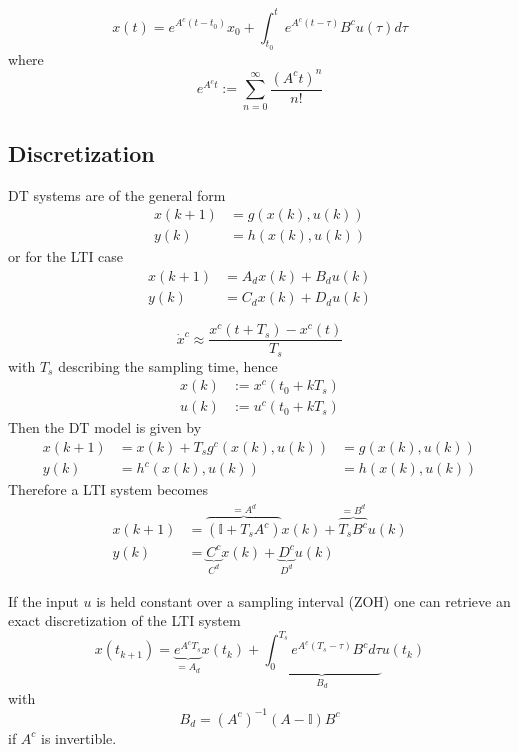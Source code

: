 
\begin{equation*}
    x(t) = e^{A^c(t-t_0)}x_0 + \int_{t_0}^{t}e^{A^c(t-\tau)}B^c u(\tau)d\tau
\end{equation*}
where
\begin{equation*}
    e^{A^c t} := \sum_{n=0}^{\infty}\frac{{(A^c t)}^n}{n!}
\end{equation*}

\subsection{Discretization}
DT systems are of the general form
\begin{align*}
    x(k+1) & =g(x(k),u(k)) \\
    y(k)   & =h(x(k),u(k))
\end{align*}
or for the LTI case
\begin{align*}
    x(k+1) & =A_d x(k)+B_d u(k) \\
    y(k)   & =C_d x(k)+D_d u(k)
\end{align*}

\begin{equation*}
    \dot{x}^c \approx \frac{x^c(t + T_s)-x^c(t)}{T_s}
\end{equation*}
with $T_s$ describing the sampling time, hence
\begin{align*}
    x(k) & := x^c(t_0 + kT_s) \\
    u(k) & := u^c(t_0 + kT_s)
\end{align*}
Then the DT model is given by
\begin{align*}
    x(k+1) & = x(k) + T_s g^c (x(k),u(k)) & = g(x(k),u(k)) \\
    y(k)   & = h^c(x(k),u(k))             & = h(x(k),u(k))
\end{align*}
Therefore a LTI system becomes
\begin{align*}
    x(k+1) & = \overbrace{(\mathbb{I} + T_s A^c)}^{=A^d} x(k) + \overbrace{T_s B^c}^{=B^d} u(k) \\
    y(k)   & = \underbrace{C^c}_{C^d} x(k) + \underbrace{D^c}_{D^d} u(k)
\end{align*}

\newpar{}

If the input $u$ is held constant over a sampling interval (ZOH) one can retrieve an exact discretization of the LTI system
\begin{equation*}
    x(t_{k+1}) = \underbrace{e^{A^c T_s}}_{=A_d} x(t_k) + \underbrace{\int_{0}^{T_s} e^{A^c(T_s - \tau)}B^c d\tau}_{B_d} u(t_k)
\end{equation*}
with
\begin{equation*}
    B_d={(A^c)}^{-1}(A-\mathbb{I})B^c
\end{equation*}
if $A^c$ is invertible.

